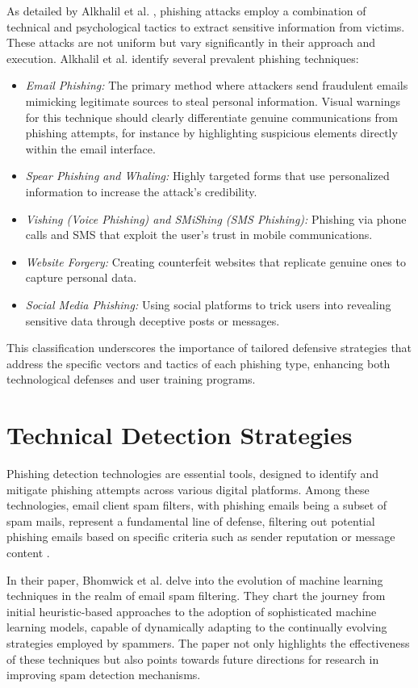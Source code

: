 \documentclass[
  a4paper,  %
  twoside,  %
  bibliography=totoc,
  headsepline,
  cleardoublepage=empty,
  parskip=half,
  draft=false
]{scrbook}
\begin{document}
As detailed by Alkhalil et al. \cite{alkhalil}, phishing attacks employ a combination of technical and psychological tactics to extract sensitive information from victims. These attacks are not uniform but vary significantly in their approach and execution.
Alkhalil et al. identify several prevalent phishing techniques:
\begin{itemize}
    \item \textit{Email Phishing:} The primary method where attackers send fraudulent emails mimicking legitimate sources to steal personal information. Visual warnings for this technique should clearly differentiate genuine communications from phishing attempts, for instance by highlighting suspicious elements directly within the email interface.
    \item \textit{Spear Phishing and Whaling:} Highly targeted forms that use personalized information to increase the attack's credibility.
    \item \textit{Vishing (Voice Phishing) and SMiShing (SMS Phishing):} Phishing via phone calls and SMS that exploit the user's trust in mobile communications.
    \item \textit{Website Forgery:} Creating counterfeit websites that replicate genuine ones to capture personal data.
    \item \textit{Social Media Phishing:} Using social platforms to trick users into revealing sensitive data through deceptive posts or messages.
\end{itemize}

This classification underscores the importance of tailored defensive strategies that address the specific vectors and tactics of each phishing type, enhancing both technological defenses and user training programs.

\section{Technical Detection Strategies}
Phishing detection technologies are essential tools, designed to identify and mitigate phishing attempts across various digital platforms. Among these technologies, email client spam filters, with phishing emails being a subset of spam mails, represent a fundamental line of defense, filtering out potential phishing emails based on specific criteria such as sender reputation \cite{shi} or message content \cite{alexy}.

In their paper, Bhomwick et al. \cite{alexy} delve into the evolution of machine learning techniques in the realm of email spam filtering. They chart the journey from initial heuristic-based approaches to the adoption of sophisticated machine learning models, capable of dynamically adapting to the continually evolving strategies employed by spammers. The paper not only highlights the effectiveness of these techniques but also points towards future directions for research in improving spam detection mechanisms.
\end{document}
